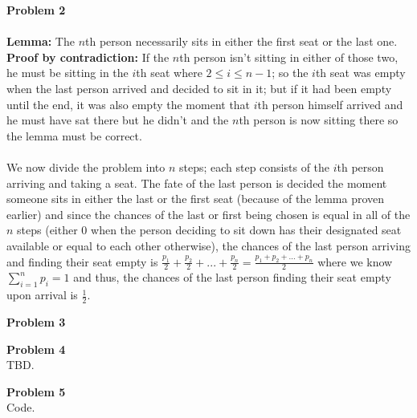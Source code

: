 \documentclass{article}
\newenvironment{problem}[2][Problem]
    { \begin{mdframed}[backgroundcolor=gray!20] \textbf{#1 #2} \\}
    {  \end{mdframed}}
\begin{document}
    \begin{problem}{2}
    	\\
    	\textbf{Lemma:} The $n$th person necessarily sits in either the first seat or the
    	last one. \\ \textbf{Proof by contradiction:} If the $n$th person isn't sitting in 
    	either of those two, he must be sitting in the $i$th seat where $2\leq i\leq n-1$;
    	so the $i$th seat was empty when the last person arrived and decided to sit in it;
    	but if it had been empty until the end, it was also empty the moment that $i$th person
    	himself arrived and he must have sat there but he didn't and the $n$th person is now
    	sitting there so the lemma must be correct. \\ \\
    	We now divide the problem into $n$ steps; each step consists of the $i$th person arriving 
    	and taking a seat. The fate of the last person is decided the moment someone sits
    	in either the last or the first seat (because of the lemma proven earlier) and since 
    	the chances of the last or first being chosen is equal in all of the $n$ 
    	steps (either $0$ when the person deciding to sit down has their designated seat available
    	or equal to each other otherwise), the chances of the last person arriving and finding 
    	their seat empty is $\displaystyle\frac{p_1}{2}+\frac{p_2}{2}+...+\frac{p_n}{2} = \frac{p_1+p_2+...+p_n}{2}$   where we know $\displaystyle\sum_{i=1}^{n}p_i=1$ and thus, the chances of the last person
    	finding their seat empty upon arrival is $\frac{1}{2}$.
    \end{problem}
    
    \begin{problem}{3}
    	
    \end{problem}
    
    \begin{problem}{4}
    	TBD.
    \end{problem}
    
    \begin{problem}{5}
    	Code.
    \end{problem}
    
\end{document}
